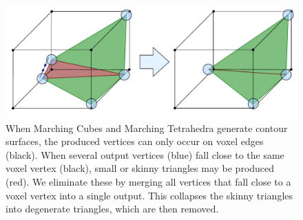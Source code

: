 \documentclass[10pt,journal,cspaper,compsoc]{IEEEtran}
\begin{document}
\begin{figure}[!tb]
\begin{center}
\includegraphics[width=\columnwidth]{SkinnyCollapse.pdf}
\caption{When Marching Cubes and Marching Tetrahedra generate contour surfaces, the produced vertices can only occur on voxel edges (black). When several output vertices (blue) fall close to the same voxel vertex (black), small or skinny triangles may be produced (red). We eliminate these by merging all vertices that fall close to a voxel vertex into a single output. This collapses the skinny triangles into degenerate triangles, which are then removed. }
\label{fig:SkinnyCollapse}
\end{center}
\end{figure}



\end{document}
